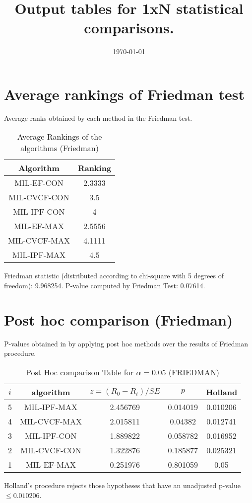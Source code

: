 \documentclass[a4paper,10pt]{article}
\title{Output tables for 1xN statistical comparisons.}
\author{}
\date{\today}
\begin{document}
\begin{landscape}
\pagestyle{empty}
\maketitle
\thispagestyle{empty}

\section{Average rankings of Friedman test}


Average ranks obtained by each method in the Friedman test.

\begin{table}[!htp]
\centering
\begin{tabular}{|c|c|}\hline
Algorithm&Ranking\\\hline
MIL-EF-CON&2.3333\\MIL-CVCF-CON&3.5\\MIL-IPF-CON&4\\MIL-EF-MAX&2.5556\\MIL-CVCF-MAX&4.1111\\MIL-IPF-MAX&4.5\\\hline\end{tabular}
\caption{Average Rankings of the algorithms (Friedman)}
\end{table}

Friedman statistic (distributed according to chi-square with 5 degrees of freedom): 9.968254. \newline P-value computed by Friedman Test: 0.07614.\newline


\newpage

\section{Post hoc comparison (Friedman)}


P-values obtained in by applying post hoc methods over the results of Friedman procedure.

\begin{table}[!htp]
\centering\footnotesize
\begin{tabular}{ccccc}
$i$&algorithm&$z=(R_0 - R_i)/SE$&$p$&Holland\\
\hline5&MIL-IPF-MAX&2.456769&0.014019&0.010206\\4&MIL-CVCF-MAX&2.015811&0.04382&0.012741\\3&MIL-IPF-CON&1.889822&0.058782&0.016952\\2&MIL-CVCF-CON&1.322876&0.185877&0.025321\\1&MIL-EF-MAX&0.251976&0.801059&0.05\\\hline
\end{tabular}
\caption{Post Hoc comparison Table for $\alpha=0.05$ (FRIEDMAN)}
\end{table}Holland's procedure rejects those hypotheses that have an unadjusted p-value $\le0.010206$.



\end{landscape}
\end{document}
